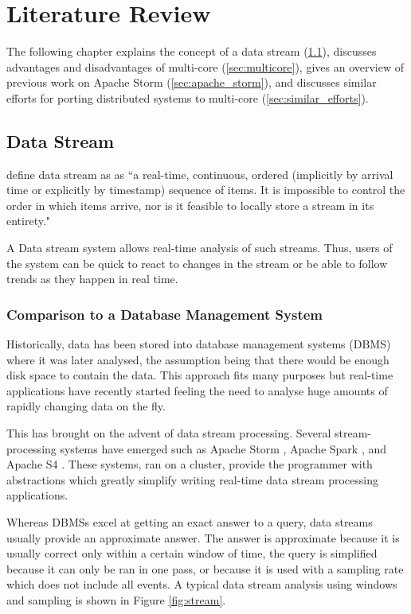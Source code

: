 \documentclass[bsc,twoside,singlespacing,normalheadings,parskip]{infthesis}\usepackage[]{graphicx}\usepackage[]{color}
\begin{document}
\clearpage{}\chapter{Literature Review}

The following chapter explains the concept of a data stream (\ref{sec:data_stream}), discusses advantages and disadvantages of multi-core (\ref{sec:multicore}), gives an overview of previous work on Apache Storm (\ref{sec:apache_storm}), and discusses similar efforts for porting distributed systems to multi-core (\ref{sec:similar_efforts}).

\section{Data Stream}
\label{sec:data_stream}

\textcite{golab2003issues} define data stream as as ``a real-time, continuous, ordered (implicitly by arrival time or explicitly by timestamp) sequence of items. It is impossible to control the order in which items arrive, nor is it feasible to locally store a stream in its entirety."

A Data stream system allows real-time analysis of such streams. Thus, users of the system can be quick to react to changes in the stream or be able to follow trends as they happen in real time.

\subsection{Comparison to a Database Management System}

Historically, data has been stored into database management systems (DBMS) where it was later analysed, the assumption being that there would be enough disk space to contain the data. This approach fits many purposes but real-time applications have recently started feeling the need to analyse huge amounts of rapidly changing data on the fly.

This has brought on the advent of data stream processing. Several stream-processing systems have emerged such as Apache Storm \citep{ApacheStorm}, Apache Spark \citep{ApacheSpark}, and Apache S4 \citep{YahooS4}. These systems, ran on a cluster, provide the programmer with abstractions which greatly simplify writing real-time data stream processing applications.

Whereas DBMSs excel at getting an exact answer to a query, data streams usually provide an approximate answer. The answer is approximate because it is usually correct only within a certain window of time, the query is simplified because it can only be ran in one pass, or because it is used with a sampling rate which does not include all events. A typical data stream analysis using windows and sampling is shown in Figure \ref{fig:stream}.
\end{document}
